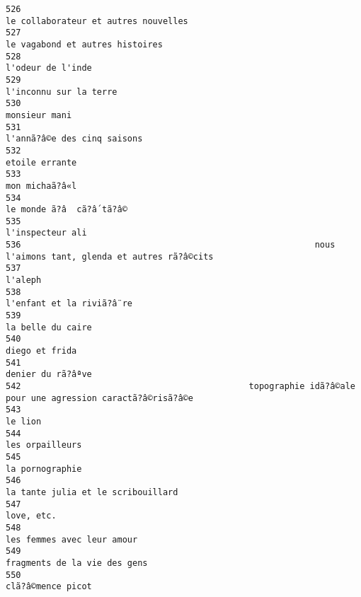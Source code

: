 \documentclass[
]{report}
\begin{document}
\begin{verbatim}
526                                                                    le collaborateur et autres nouvelles
527                                                                         le vagabond et autres histoires
528                                                                                       l'odeur de l'inde
529                                                                                  l'inconnu sur la terre
530                                                                                           monsieur mani
531                                                                             l'annã?â©e des cinq saisons
532                                                                                          etoile errante
533                                                                                          mon michaã?â«l
534                                                                                le monde ã?â  cã?â´tã?â©
535                                                                                        l'inspecteur ali
536                                                          nous l'aimons tant, glenda et autres rã?â©cits
537                                                                                                 l'aleph
538                                                                               l'enfant et la riviã?â¨re
539                                                                                       la belle du caire
540                                                                                          diego et frida
541                                                                                       denier du rã?âªve
542                                             topographie idã?â©ale pour une agression caractã?â©risã?â©e
543                                                                                                 le lion
544                                                                                         les orpailleurs
545                                                                                         la pornographie
546                                                                      la tante julia et le scribouillard
547                                                                                              love, etc.
548                                                                              les femmes avec leur amour
549                                                                            fragments de la vie des gens
550                                                                                       clã?â©mence picot

\end{verbatim}
\end{document}

